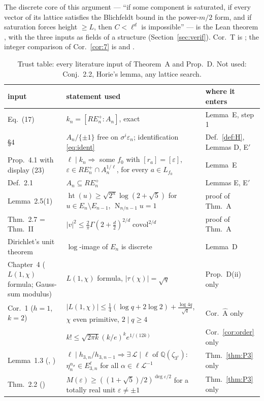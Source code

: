 \documentclass[11pt]{amsart}
\theoremstyle{remark}\newtheorem{remark}[theorem]{Remark}
\theoremstyle{definition}\newtheorem{definition}[theorem]{Definition}
\newcommand{\Q}{\mathbb{Q}}\newcommand{\Z}{\mathbb{Z}}\newcommand{\R}{\mathbb{R}}\newcommand{\F}{\mathbb{F}}
\newcommand{\RE}{RE^{+}_n}\newcommand{\ord}{\operatorname{ord}}\newcommand{\hgt}{\operatorname{ht}}
\newcommand{\Nr}{\operatorname{N}_{n/n-1}}\newcommand{\covol}{\operatorname{covol}}
\begin{document}
The discrete core of this argument --- ``if some component is saturated, if every vector of its lattice satisfies the Blichfeldt bound in the power-$m/2$ form, and if saturation forces height $\ge L$, then $C<\ell^d$ is impossible'' --- is the Lean theorem , with the three inputs as fields of a structure (Section~\ref{sec:verif}). Cor.~T is ; the integer comparison of Cor.~\ref{cor:7} is  and .

\begin{table}[h]\small
\begin{tabular}{@{}p{3.4cm}p{5.0cm}p{3.3cm}@{}}\toprule
input & statement used & where it enters\\ \midrule
\cite{KY} Eq.~(17) & $k_n=[\RE:A_n]$, exact & Lemma~E, step 1\\
\cite{KY} \S4 & $A_n/\{\pm1\}$ free on $\sigma^i\varepsilon_n$; identification \eqref{eq:ident} & Def.~\ref{def:H}, Lemmas D, E$'$\\
\cite{KY} Prop.~4.1 with display (23) & $\ell\mid k_n\Rightarrow$ some $f_0$ with $[r_a]=[\varepsilon]$, $\varepsilon\in\RE\cap A_n^{1/\ell}$, for every $a\in L_{f_0}$ & Lemma~E\\
\cite{KY} Def.~2.1 & $A_n\subseteq\RE$ & Lemmas E, E$'$\\
\cite{MO16} Lemma~2.5(1) & $\hgt(u)\ge\sqrt{2^n}\log(2+\sqrt5)$ for $u\in E_n\setminus E_{n-1}$, $\Nr u=1$ & proof of Thm.~A\\
\cite{MO16} Thm.~2.7 = \cite{Bl14} Thm.~II & $|v|^2\le\frac2\pi\Gamma(2+\frac d2)^{2/d}\covol^{2/d}$ & proof of Thm.~A\\
Dirichlet's unit theorem & $\log$-image of $E_n$ is discrete & Lemma~D\\
\cite{Wash} Chapter~4 ($L(1,\chi)$ formula; Gauss-sum modulus) & $L(1,\chi)$ formula, $|\tau(\chi)|=\sqrt q$ & Prop.~D(ii) only\\
\cite{Ram04} Cor.~1 ($h=1$, $k=2$) & $|L(1,\chi)|\le\frac14(\log q+2\log2)+\frac{\log 4q}{\sqrt q}$, $\chi$ even primitive, $2\mid q\ge4$ & Cor.~$\widehat{\mathrm A}$ only\\
\cite{Rob55} & $k!\le\sqrt{2\pi k}(k/e)^ke^{1/(12k)}$ & Cor.~\ref{cor:order} only\\
\cite{MO13} Lemma~1.3 (\cite{Ho05b}, \cite{Ho02}) & $\ell\mid h_{3,n}/h_{3,n-1}\Rightarrow\exists\,\mathcal L\mid\ell$ of $\Q(\zeta_{3^r})$: $\eta_n^{\alpha_\sigma}\in E_{3,n}^{\ell}$ for all $\alpha\in\ell\mathcal L^{-1}$ & Thm.~\ref{thm:P3} only\\
\cite{MO13} Thm.~2.2 (\cite{Sch73}) & $M(\varepsilon)\ge((1+\sqrt5)/2)^{\deg\varepsilon/2}$ for a totally real unit $\varepsilon\ne\pm1$ & Thm.~\ref{thm:P3} only\\
\bottomrule\end{tabular}
\caption{Trust table: every literature input of Theorem~A and Prop.~D. Not used: \cite{KY} Conj.~2.2, Horie's lemma, any lattice search.}\label{tab:trust}
\end{table}
\end{document}
